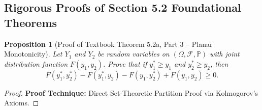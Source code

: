 \documentclass[11pt, letterpaper]{article}
\newtheorem{proposition}[theorem]{Proposition}
\theoremstyle{definition}
\theoremstyle{remark}
\begin{document}
\subsection{Rigorous Proofs of Section 5.2 Foundational Theorems}

\begin{proposition}[Proof of Textbook Theorem 5.2a, Part 3 -- Planar Monotonicity]
Let $Y_1$ and $Y_2$ be random variables on $(\Omega, \mathcal{F}, \mathbb{P})$ with joint distribution function $F(y_1, y_2)$. Prove that if $y_1^* \ge y_1$ and $y_2^* \ge y_2$, then
\[
    F(y_1^*, y_2^*) - F(y_1^*, y_2) - F(y_1, y_2^*) + F(y_1, y_2) \ge 0.
\]
\end{proposition}

\begin{proof}
\textbf{Proof Technique:} Direct Set-Theoretic Partition Proof via Kolmogorov's Axioms.


\end{proof}
\end{document}
